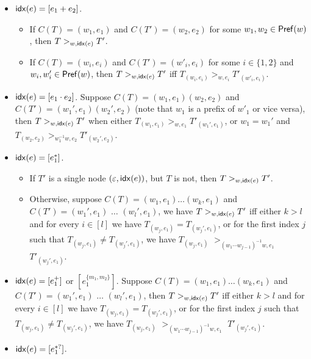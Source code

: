 \begin{definition}
\begin{itemize}
  		\item ${\sf idx}(e) = [e_1 + e_2]$.
  		\begin{itemize}
  			\item If $C (T) = (w_1, e_1)$ and $C (T') = (w_2, e_2)$ for some $w_1, w_2 \in \mathsf{Pref}(w)$, then $T >_{w, {\sf idx}(e)} T'$.
%  			
  			\item If $C (T) = (w_i, e_i)$ and $C (T') = (w'_i, e_i)$ for some $i \in \{ 1,
  			2 \}$ and $w_i, w'_i \in \mathsf{Pref}(w)$, then $T >_{w, {\sf idx}(e)} T'$ iff $T_{(w_i, e_i)} >_{w, e_i} T'_{(w'_i, e_i)}$.
  		\end{itemize}
  		\item ${\sf idx}(e) = [e_1 \cdot e_2]$. Suppose $C (T) = (w_1, e_1) (w_2, e_2)$ and $C (T') =
  		(w_1', e_1) (w_2', e_2)$ (note that $w_1$ is a prefix of $w'_1$ or vice versa), then $T >_{w, {\sf idx}(e)} T'$ when either $T_{(w_1, e_1)} >_{w, e_1}
  		T'_{(w_1', e_1)}$, or $w_1 = w_1'$ and $T_{(w_2, e_2)} >_{w_1^{-1}w, e_2} T'_{(w_2', e_2)}$. 
%  		
  		\item ${\sf idx}(e) = [e_1^{\ast}]$. 
		\begin{itemize}
		\item If $T' $ is  a single node $(\varepsilon, {\sf idx}(e))$, but $T$ is not, then $T >_{w, {\sf idx}(e)} T'$.
  		\item Otherwise, suppose $C(T) = (w_1, e_1) \ldots (w_k, e_1)$ and $C (T') = (w_1', e_1)$ $\ldots$ $(w_l', e_1)$, we have $T >_{w, {\sf idx}(e)} T'$ iff either $k > l$ and for every $i \in [l]$ we have $T_{(w_j, e_1)} = T_{(w_j', e_1)}$, or for the first index $j$ such that $T_{(w_j, e_1)} \neq T_{(w_j', e_1)}$, we have $T_{(w_j, e_1)}$ $>_{(w_1\cdots w_{j-1})^{-1}w, e_1}$ $T'_{(w_j', e_1)}$.
		\end{itemize}
%
  		\item ${\sf idx}(e) = [e_1^{+}]$ or $[e_1^{\{m_1, m_2\}}]$. 
  		Suppose $C(T) = (w_1, e_1) \ldots (w_k, e_1)$ and $C (T') = (w_1', e_1)$ $\ldots$ $(w_l', e_1)$, then $T >_{w, {\sf idx}(e)} T'$ iff either $k > l$ and for every $i \in [l]$ we have $T_{(w_j, e_1)} = T_{(w_j', e_1)}$, or for the first index $j$ such that $T_{(w_j, e_1)} \neq T_{(w_j', e_1)}$, we have $T_{(w_j, e_1)}$ $>_{(w_1\cdots w_{j-1})^{-1}w, e_1}$ $T'_{(w_j', e_1)}$.
%
  		\item ${\sf idx}(e) = [e_1^{\ast?}]$. 
\end{itemize}
\end{definition}
